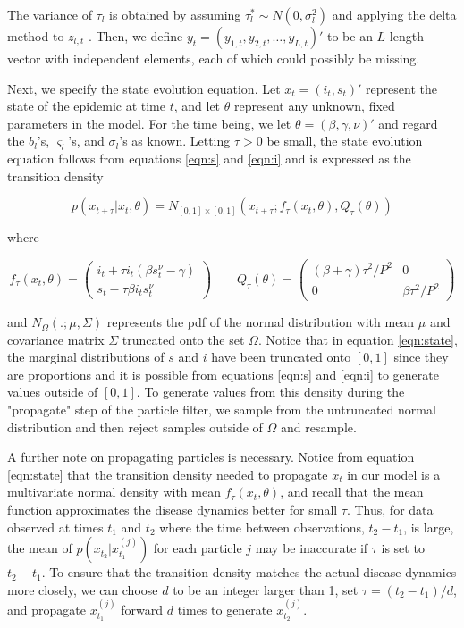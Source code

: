 \documentclass{elsarticle}
\begin{document}
\noindent The variance of $\tau_l$ is obtained by assuming $\tau^*_l \sim N(0,\sigma_l^2)$ and applying the delta method to $z_{l,t}$ \citep[chap. 5]{Case:Berg:stat:2002}.  Then, we define $y_t = (y_{1,t},y_{2,t},\ldots,y_{L,t})'$ to be an $L$-length vector with independent elements, each of which could possibly be missing.

Next, we specify the state evolution equation.  Let $x_t = (i_t,s_t)'$ represent the state of the epidemic at time $t$, and let $\theta$ represent any unknown, fixed parameters in the model.  For the time being, we let $\theta = (\beta, \gamma, \nu)'$ and regard the $b_l$'s, $\varsigma_l$'s, and $\sigma_l$'s as known.  Letting $\tau > 0$ be small, the state evolution equation follows from equations \eqref{eqn:s} and \eqref{eqn:i} and is expressed as the transition density

\begin{equation}
p\left(x_{t+\tau}\left|x_t,\theta\right.\right) = N_{[0,1]\times[0,1]}\left(x_{t+\tau};f_\tau(x_t,\theta),Q_{\tau}(\theta)\right) \label{eqn:state}
\end{equation}

\noindent where

\[
f_\tau(x_t,\theta) = \left(
\begin{array}{c}
i_t + \tau i_t(\beta s^{\nu}_t - \gamma) \\
s_t - \tau\beta i_ts^{\nu}_t
\end{array}
\right)
\qquad
Q_\tau(\theta) = \left(
\begin{array}{ccccc}
(\beta + \gamma)\tau^2/P^2 & 0 \\
0 & \beta\tau^2/P^2
\end{array}
\right)
\]

\noindent and $N_{\Omega}(.;\mu,\Sigma)$ represents the pdf of the normal distribution with mean $\mu$ and covariance matrix $\Sigma$ truncated onto the set $\Omega$.  Notice that in equation \eqref{eqn:state}, the marginal distributions of $s$ and $i$ have been truncated onto $[0,1]$ since they are proportions and it is possible from equations \eqref{eqn:s} and \eqref{eqn:i} to generate values outside of $[0,1]$.  To generate values from this density during the "propagate" step of the particle filter, we sample from the untruncated normal distribution and then reject samples outside of $\Omega$ and resample.

A further note on propagating particles is necessary.  Notice from equation \eqref{eqn:state} that the transition density needed to propagate $x_t$ in our model is a multivariate normal density with mean $f_\tau(x_t,\theta)$, and recall that the mean function approximates the disease dynamics better for small $\tau$.  Thus, for data observed at times $t_1$ and $t_2$ where the time between observations, $t_2 - t_1$, is large, the mean of $p(x_{t_2}|x_{t_1}^{(j)})$ for each particle $j$ may be inaccurate if $\tau$ is set to $t_2 - t_1$.  To ensure that the transition density matches the actual disease dynamics more closely, we can choose $d$ to be an integer larger than 1, set $\tau = (t_2 - t_1) / d$, and propagate $x_{t_1}^{(j)}$ forward $d$ times to generate $x_{t_2}^{(j)}$.
\end{document}
